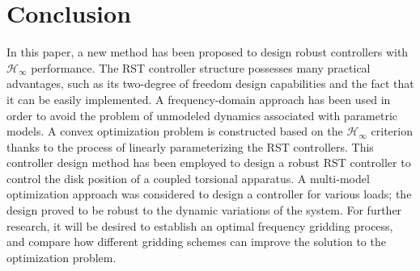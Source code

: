 \documentclass[a4paper, 10pt, conference]{ieeeconf}
\begin{document}
\section{Conclusion}
\label{sec:5}
In this paper, a new method has been proposed to design robust controllers with $\mathcal{H}_{\infty}$ performance. The RST controller structure possesses many practical advantages, such as its two-degree of freedom design capabilities and the fact that it can be easily implemented. A frequency-domain approach has been used in order to avoid the problem of unmodeled dynamics associated with parametric models. A convex optimization problem is constructed based on the $\mathcal{H}_{\infty}$ criterion thanks to the process of linearly parameterizing the RST controllers. This controller design method has been employed to design a robust RST controller to control the disk position of a coupled torsional apparatus. A multi-model optimization approach was considered to design a controller for various loads; the design proved to be robust to the dynamic variations of the system. For further research, it will be desired to establish an optimal frequency gridding process, and compare how different gridding schemes can improve the solution to the optimization problem.





\end{document}
